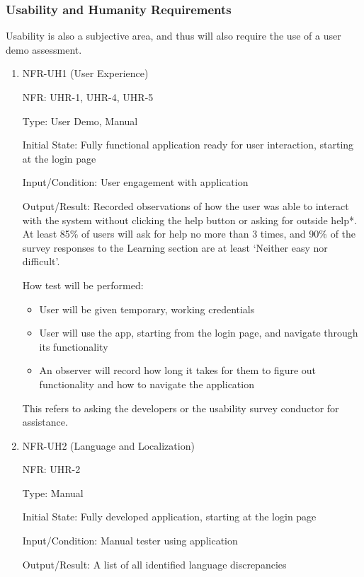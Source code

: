 \documentclass[12pt, titlepage]{article}
\begin{document}
\subsubsection{Usability and Humanity Requirements}
Usability is also a subjective area, and thus will also require the use of a
user demo assessment.
\begin{enumerate}

  \item{NFR-UH1 (User Experience)\\}
  
  NFR: UHR-1, UHR-4, UHR-5

  Type: User Demo, Manual

  Initial State: Fully functional application ready for user interaction,
  starting at the login page
  
  Input/Condition: User engagement with application
  
  Output/Result: Recorded observations of how the user was able to interact with
  the system without clicking the help button or asking for outside help*. At
  least 85\% of users will ask for help no more than 3 times, and 90\% of the
  survey responses to the Learning section are at least `Neither easy nor
  difficult'.
  
  How test will be performed:
  \begin{itemize}
    \item User will be given temporary, working credentials 
    \item User will use the app, starting from the login page, and navigate
    through its functionality
    \item An observer will record how long it takes for them to figure out
    functionality and how to navigate the application
  \end{itemize}
  {\footnotesize *This refers to asking the developers or the usability survey
  conductor for assistance.}
            
  \item{NFR-UH2 (Language and Localization)\\}
  
  NFR: UHR-2
  
  Type: Manual
  
  Initial State: Fully developed application, starting at the login page
  
  Input/Condition: Manual tester using application
  
  Output/Result: A list of all identified language discrepancies
  

\end{enumerate}
\end{document}
